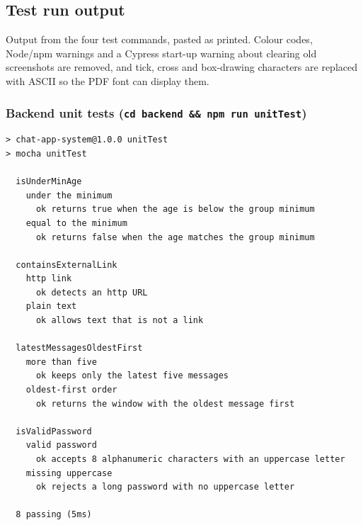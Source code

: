 \documentclass[10pt,a4paper]{article}
\newcommand{\ep}[1]{\texttt{\small #1}}
\begin{document}
\subsection{Test run output}\label{sec:runs}
Output from the four test commands, pasted as printed. Colour codes, Node/npm warnings and a Cypress start-up warning about clearing old screenshots are removed, and tick, cross and box-drawing characters are replaced with ASCII so the PDF font can display them.

\subsubsection*{Backend unit tests (\ep{cd backend \&\& npm run unitTest})}
\begin{Verbatim}[fontsize=\scriptsize,breaklines,frame=single]
> chat-app-system@1.0.0 unitTest
> mocha unitTest

  isUnderMinAge
    under the minimum
      ok returns true when the age is below the group minimum
    equal to the minimum
      ok returns false when the age matches the group minimum

  containsExternalLink
    http link
      ok detects an http URL
    plain text
      ok allows text that is not a link

  latestMessagesOldestFirst
    more than five
      ok keeps only the latest five messages
    oldest-first order
      ok returns the window with the oldest message first

  isValidPassword
    valid password
      ok accepts 8 alphanumeric characters with an uppercase letter
    missing uppercase
      ok rejects a long password with no uppercase letter

  8 passing (5ms)
\end{Verbatim}
\end{document}
